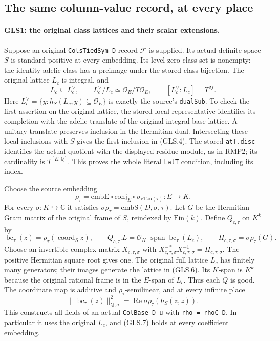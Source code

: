 \subsection{The same column-value record, at every place}

\paragraph{GLS1: the original class lattices and their scalar extensions.}
\label{claim:GLS1}
Suppose an original \texttt{ColsTiedSym D} record $\mathcal F$ is
supplied.  Its actual definite space $S$ is standard positive at every
embedding.  Its level-zero class set is nonempty: the identity adelic
class has a preimage under the stored class bijection.  The original
lattice $L_c$ is integral, and
\[
 L_c\subseteq L_c^\vee,\qquad
 L_c^\vee/L_c\simeq\mathcal O_E/T\mathcal O_E,
 \qquad [L_c^\vee:L_c]=T^{2f}.                 \tag{GLS.4}
\]
Here $L_c^\vee=\{y:h_S(L_c,y)\subseteq\mathcal O_E\}$ is exactly
the source's \texttt{dualSub}.  To check the first assertion on the
original lattice, the stored local representative identifies its
completion with the adelic translate of the original integral base
lattice.  A unitary translate preserves inclusion in the Hermitian
dual.  Intersecting these local inclusions with $S$ gives the first
inclusion in (GLS.4).  The stored \texttt{atT.disc} identifies the
actual quotient with the displayed residue module, as in RMP2; its
cardinality is $T^{[E:\mathbb Q]}$.  This proves the whole literal
\texttt{LatT} condition, including its index.

Choose the source embedding
\[
 \rho_\tau=\mathrm{embE}\circ\mathrm{conj}_E\circ
                   \sigma_{\mathrm{eTau}(\tau)}:E\longrightarrow K.
 \tag{GLS.5}
\]
For every $\sigma:K\hookrightarrow\mathbb C$ it satisfies
$\sigma\rho_\tau=\overline{\mathrm{embS}(D,\sigma,\tau)}$.
Let $G$ be the Hermitian Gram matrix of the original frame of $S$,
reindexed by $\mathrm{Fin}(k)$.  Define $Q_{c,\tau}$ on $K^k$ by
\[
 \operatorname{bc}_\tau(z)=\rho_\tau(\operatorname{coord}_S z),
 \qquad Q_{c,\tau}.L=
       \mathcal O_K\operatorname{-span}\operatorname{bc}_\tau(L_c),
 \qquad H_{c,\tau,\sigma}=\sigma\rho_\tau(G).
 \tag{GLS.6}
\]
Choose an invertible complex matrix $X_{c,\tau,\sigma}$ with
$X_{c,\tau,\sigma}^{-*}X_{c,\tau,\sigma}^{-1}
=H_{c,\tau,\sigma}$.  The positive Hermitian square root gives one.
The original full lattice $L_c$ has finitely many generators; their
images generate the lattice in (GLS.6).  Its $K$-span is $K^k$ because
the original rational frame is in the $E$-span of $L_c$.  Thus each $Q$
is good.  The coordinate map is additive and $\rho_\tau$-semilinear,
and at every infinite place
\[
 \|\operatorname{bc}_\tau(z)\|_{Q,\sigma}^{2}
       =\operatorname{Re}\sigma\rho_\tau(h_S(z,z)).
 \tag{GLS.7}
\]
This constructs all fields of an actual \texttt{ColBase D u} with
\texttt{rho = rhoC D}.  In particular it uses the original $L_c$,
and (GLS.7) holds at every coefficient embedding.

